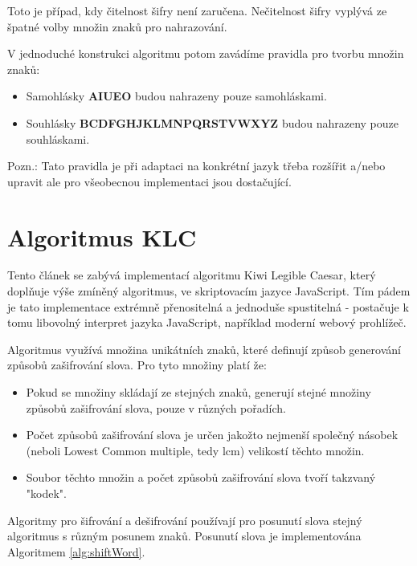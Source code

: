 \documentclass[12pt,a4paper]{article}
\let\oldsection\section
\renewcommand\section{\clearpage\oldsection}
\begin{document}
Toto je případ, kdy čitelnost šifry není zaručena. Nečitelnost šifry vyplývá ze špatné volby množin znaků pro nahrazování.

V jednoduché konstrukci algoritmu potom zavádíme pravidla pro tvorbu množin znaků:
\begin{itemize}
\item Samohlásky \textbf{AIUEO} budou nahrazeny pouze samohláskami.
\item Souhlásky \textbf{BCDFGHJKLMNPQRSTVWXYZ} budou nahrazeny pouze souhláskami.
\end{itemize}
Pozn.: Tato pravidla je při adaptaci na konkrétní jazyk třeba rozšířit a/nebo upravit ale pro všeobecnou implementaci jsou dostačující.

\section{Algoritmus KLC}
Tento článek se zabývá implementací algoritmu Kiwi Legible Caesar, který doplňuje výše zmíněný algoritmus, ve skriptovacím jazyce JavaScript. Tím pádem je tato implementace extrémně přenositelná a jednoduše spustitelná - postačuje k tomu libovolný interpret jazyka JavaScript, například moderní webový prohlížeč.

Algoritmus využívá množina unikátních znaků, které definují způsob generování způsobů zašifrování slova. Pro tyto množiny platí že:
\begin{itemize}
\setlength\itemsep{0.1em}
\item Pokud se množiny skládají ze stejných znaků, generují stejné množiny způsobů zašifrování slova, pouze v různých pořadích.
\item Počet způsobů zašifrování slova je určen jakožto nejmenší společný násobek (neboli Lowest Common multiple, tedy lcm) velikostí těchto množin.
\item Soubor těchto množin a počet způsobů zašifrování slova tvoří takzvaný "kodek".
\end{itemize}

Algoritmy pro šifrování a dešifrování používají pro posunutí slova stejný algoritmus s různým posunem znaků. Posunutí slova je implementována Algoritmem \ref{alg:shiftWord}. \\ 
\end{document}
